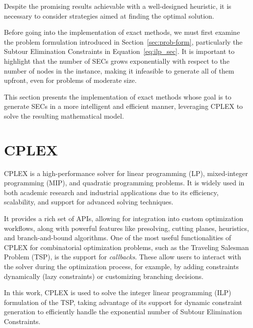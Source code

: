 Despite the promising results achievable with a well-designed heuristic, it is necessary to consider strategies aimed at finding the optimal solution.

Before going into the implementation of exact methods, we must first examine the problem formulation introduced in Section~\ref{sec:prob-form}, particularly the Subtour Elimination Constraints in Equation~\ref{eq:ilp_sec}. It is important to highlight that the number of SECs grows exponentially with respect to the number of nodes in the instance, making it infeasible to generate all of them upfront, even for problems of moderate size.

This section presents the implementation of exact methods whose goal is to generate SECs in a more intelligent and efficient manner, leveraging CPLEX to solve the resulting mathematical model.

\section{CPLEX}

CPLEX is a high-performance solver for linear programming (LP), mixed-integer programming (MIP), and quadratic programming problems. It is widely used in both academic research and industrial applications due to its efficiency, scalability, and support for advanced solving techniques.

It provides a rich set of APIs, allowing for integration into custom optimization workflows, along with powerful features like presolving, cutting planes, heuristics, and branch-and-bound algorithms. One of the most useful functionalities of CPLEX for combinatorial optimization problems, such as the Traveling Salesman Problem (TSP), is the support for \emph{callbacks}. These allow users to interact with the solver during the optimization process, for example, by adding constraints dynamically (lazy constraints) or customizing branching decisions.

In this work, CPLEX is used to solve the integer linear programming (ILP) formulation of the TSP, taking advantage of its support for dynamic constraint generation to efficiently handle the exponential number of Subtour Elimination Constraints.
